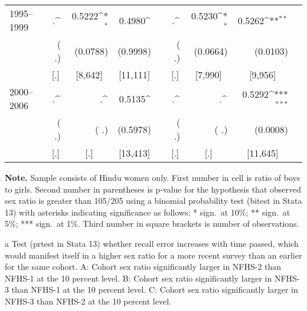 \documentclass[12pt,letterpaper]{article}
\newcommand{\mco}[1]{\multicolumn{1}{c}{#1}}
\def\sym#1{\ifmmode^{#1}\else\(^{#1}\)\fi}
\begin{document}
\begin{table}[!htbp]
\begin{center}
\begin{small}
\begin{threeparttable}
\begin{tabular} {@{} l D{.}{.}{1.6} D{.}{.}{1.6} D{.}{.}{1.6} l D{.}{.}{1.6} D{.}{.}{1.6} D{.}{.}{1.6} l  @{}}
1995--1999         &      .\sym{}      & 0.5222\sym{*}     & 0.4980\sym{}      &       &      .\sym{}      & 0.5230\sym{*}     & 0.5262\sym{**}    &           \\
                   & (     .)          & (0.0788)          & (0.9998)          &       & (     .)          & (0.0664)          & (0.0103)          &           \\
                   & \mco{[.]}         & \mco{[8,642]}     & \mco{[11,111]}    &       & \mco{[.]}         & \mco{[7,990]}     & \mco{[9,956]}     &           \\
2000--2006         &      .\sym{}      &      .\sym{}      & 0.5135\sym{}      &       &      .\sym{}      &      .\sym{}      & 0.5292\sym{***}   &           \\
                   & (     .)          & (     .)          & (0.5978)          &       & (     .)          & (     .)          & (0.0008)          &           \\
                   & \mco{[.]}         & \mco{[.]}         & \mco{[13,413]}    &       & \mco{[.]}         & \mco{[.]}         & \mco{[11,645]}    &           \\
\bottomrule
\end{tabular}                        
\begin{tablenotes} \scriptsize
\item \hspace*{-0.6em} \textbf{Note.} 
Sample consists of Hindu women only.
First number in cell is ratio of boys to girls. 
Second number in parentheses is p-value for the hypothesis that observed sex ratio is 
greater than 105/205 using a binomial probability test (bitest in Stata 13)
with asterisks indicating significance as follows: 
* sign.\ at 10\%; ** sign.\ at 5\%; *** sign.\ at 1\%.
Third number in square brackets is number of observations.
\item[a] 
Test (prtest in Stata 13) whether recall error increases 
with time passed, which would manifest itself in a higher sex ratio for a more recent
survey than an earlier for the same cohort.
A: Cohort sex ratio significantly larger in NFHS-2 than NFHS-1 at the 10 percent level. 
B: Cohort sex ratio significantly larger in NFHS-3 than NFHS-1 at the 10 percent level. 
C: Cohort sex ratio significantly larger in NFHS-3 than NFHS-2 at the 10 percent level. 
\end{tablenotes}
\end{threeparttable}
\end{small}
\end{center}
\end{table}
\end{document}
